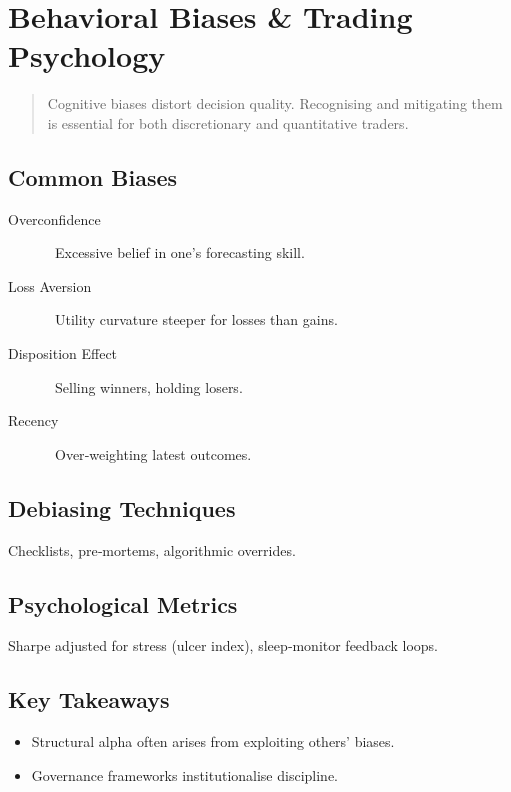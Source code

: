 \chapter{Behavioral Biases \& Trading Psychology}\label{ch:behaviour}

\begin{abstract}
Cognitive biases distort decision quality.  Recognising and mitigating
them is essential for both discretionary and quantitative traders.
\end{abstract}

\section{Common Biases}

\begin{description}
  \item[Overconfidence] Excessive belief in one’s forecasting skill.
  \item[Loss Aversion] Utility curvature steeper for losses than gains.
  \item[Disposition Effect] Selling winners, holding losers.
  \item[Recency] Over‐weighting latest outcomes.
\end{description}

\section{Debiasing Techniques}

Checklists, pre‑mortems, algorithmic overrides.

\section{Psychological Metrics}

Sharpe adjusted for stress (ulcer index), sleep‑monitor feedback loops.

\section*{Key Takeaways}

\begin{itemize}
  \item Structural alpha often arises from exploiting others’ biases.
  \item Governance frameworks institutionalise discipline.
\end{itemize}
